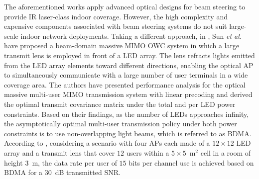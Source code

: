 \documentclass[lettersize,journal]{IEEEtran}
\begin{document}
The aforementioned works apply advanced optical designs for beam steering to provide \ac{IR} laser-class indoor coverage. However, the high complexity and expensive components associated with beam steering systems do not suit large-scale indoor network deployments. Taking a different approach, in \cite{CSun2019beam,CSun2020networked}, Sun \textit{et al.} have proposed a beam-domain massive \ac{MIMO} \ac{OWC} system in which a large transmit lens is employed in front of a \ac{LED} array. The lens refracts lights emitted from the \ac{LED} array elements toward different directions, enabling the optical \ac{AP} to simultaneously communicate with a large number of user terminals in a wide coverage area. The authors have presented performance analysis for the optical massive multi-user \ac{MIMO} transmission system with linear precoding and derived the optimal transmit covariance matrix under the total and per \ac{LED} power constraints. Based on their findings, as the number of \acp{LED} approaches infinity, the asymptotically optimal multi-user transmission policy under both power constraints is to use non-overlapping light beams, which is referred to as \ac{BDMA}. According to \cite{CSun2020networked}, considering a scenario with four \acp{AP} each made of a $12\times12$ \ac{LED} array and a transmit lens that cover $12$ users within a $5\times5$~m$^2$ cell in a room of height $3$~m, the data rate per user of $15$ bits per channel use is achieved based on \ac{BDMA} for a $30$~dB transmitted \ac{SNR}.
\end{document}
